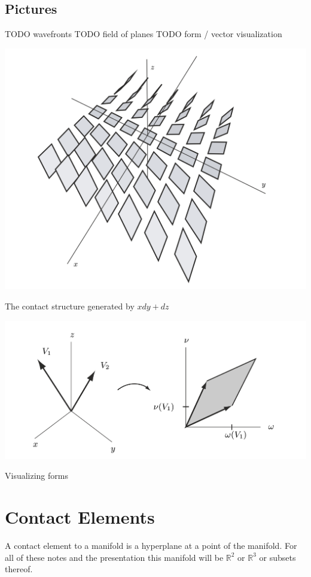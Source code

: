 \documentclass{article}
\begin{document}
\subsection {Pictures}

TODO wavefronts
TODO field of planes
TODO form / vector visualization

\includegraphics[scale=0.3]{contact_elements_bachman}

The contact structure generated by $xdy + dz$

\includegraphics[scale=0.5]{form_vis_bachman}

Visualizing forms

\pagebreak


\section {Contact Elements}

A contact element to a manifold is a hyperplane at a point of the manifold. For
all of these notes and the presentation this manifold will be $\mathbb{R}^{2}$
or $\mathbb{R}^{3}$ or subsets thereof.
\end{document}
